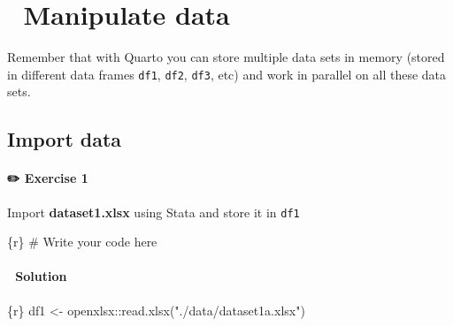 \documentclass[
  letterpaper,
  DIV=11,
  numbers=noendperiod,
  oneside]{scrreprt}
\newenvironment{Shaded}{\begin{snugshade}}{\end{snugshade}}
\newcommand{\CommentTok}[1]{\textcolor[rgb]{0.37,0.37,0.37}{#1}}
\newcommand{\FunctionTok}[1]{\textcolor[rgb]{0.28,0.35,0.67}{#1}}
\newcommand{\InformationTok}[1]{\textcolor[rgb]{0.37,0.37,0.37}{#1}}
\newcommand{\NormalTok}[1]{\textcolor[rgb]{0.00,0.23,0.31}{#1}}
\newcommand{\OtherTok}[1]{\textcolor[rgb]{0.00,0.23,0.31}{#1}}
\newcommand{\SpecialCharTok}[1]{\textcolor[rgb]{0.37,0.37,0.37}{#1}}
\newcommand{\StringTok}[1]{\textcolor[rgb]{0.13,0.47,0.30}{#1}}
\begin{document}
\hypertarget{manipulate-data}{%
\chapter{\texorpdfstring{{📘} Manipulate
data}{📘 Manipulate data}}\label{manipulate-data}}

\begin{tcolorbox}[enhanced jigsaw, colbacktitle=quarto-callout-important-color!10!white, titlerule=0mm, breakable, opacityback=0, opacitybacktitle=0.6, left=2mm, coltitle=black, colback=white, title=\textcolor{quarto-callout-important-color}{\faExclamation}\hspace{0.5em}{Important}, rightrule=.15mm, colframe=quarto-callout-important-color-frame, toprule=.15mm, bottomtitle=1mm, toptitle=1mm, arc=.35mm, bottomrule=.15mm, leftrule=.75mm]
Remember that with Quarto you can store multiple data sets in memory
(stored in different data frames \texttt{df1}, \texttt{df2},
\texttt{df3}, etc) and work in parallel on all these data sets.
\end{tcolorbox}

\hypertarget{import-data}{%
\section{Import data}\label{import-data}}

\hypertarget{exercise-1-1}{%
\subsubsection{\texorpdfstring{{✏️} Exercise
1}{✏️ Exercise 1}}\label{exercise-1-1}}

Import \textbf{dataset1.xlsx} using Stata and store it in \texttt{df1}

\begin{Shaded}
\begin{Highlighting}[]
\InformationTok{\textasciigrave{}\textasciigrave{}\textasciigrave{}\{r\}}
\CommentTok{\# Write your code here}
\InformationTok{\textasciigrave{}\textasciigrave{}\textasciigrave{}}
\end{Highlighting}
\end{Shaded}

\hypertarget{solution}{%
\subsubsection{\texorpdfstring{{👀}
Solution}{👀 Solution}}\label{solution}}

\begin{Shaded}
\begin{Highlighting}[]
\InformationTok{\textasciigrave{}\textasciigrave{}\textasciigrave{}\{r\}}
\NormalTok{df1 }\OtherTok{\textless{}{-}}\NormalTok{ openxlsx}\SpecialCharTok{::}\FunctionTok{read.xlsx}\NormalTok{(}\StringTok{"./data/dataset1a.xlsx"}\NormalTok{)}
\InformationTok{\textasciigrave{}\textasciigrave{}\textasciigrave{}}
\end{Highlighting}
\end{Shaded}
\end{document}
